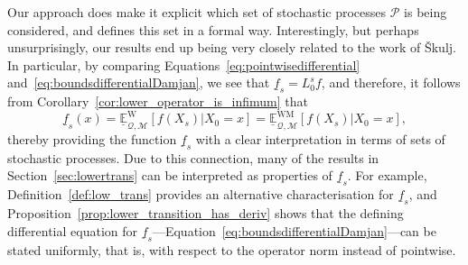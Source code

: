 \documentclass[10pt,a4paper]{paper}
\theoremstyle{definition}
\newcommand{\rateset}{\mathcal{Q}}
\newcommand{\lrate}{\underline{Q}}
\newcommand{\coloneqq}{:\!=}
\begin{document}
Our approach does make it explicit which set of stochastic processes $\mathcal{P}$ is being considered, and defines this set in a formal way. Interestingly, but perhaps unsurprisingly, our results end up being very closely related to the work of {\v{S}kulj}.
In particular, by comparing Equations~\eqref{eq:pointwisedifferential} and~\eqref{eq:boundsdifferentialDamjan}, we see that $\underline{f}_s=L_0^sf$, and therefore, it follows from Corollary~\ref{cor:lower_operator_is_infimum} that
\begin{equation*}
\underline{f}_s(x)
=
\underline{\mathbb{E}}_{\rateset,\mathcal{M}}^{\mathrm{W}}[f(X_s)\vert X_0=x]
=
\underline{\mathbb{E}}_{\rateset,\mathcal{M}}^{\mathrm{WM}}[f(X_s)\vert X_0=x],
\end{equation*}
thereby providing the function $\underline{f}_s$ with a clear interpretation in terms of sets of stochastic processes. Due to this connection, many of the results in Section~\ref{sec:lowertrans} can be interpreted as properties of $\underline{f}_s$. For example, Definition~\ref{def:low_trans} provides an alternative characterisation for $\underline{f}_s$, and Proposition~\ref{prop:lower_transition_has_deriv} shows that the defining differential equation for $\underline{f}_s$---Equation~\eqref{eq:boundsdifferentialDamjan}---can be stated uniformly, that is, with respect to the operator norm instead of pointwise.


\end{document}
